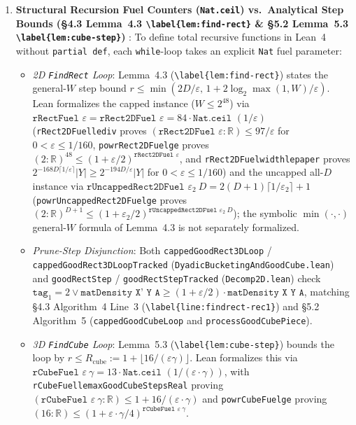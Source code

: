\documentclass[10pt,letterpaper]{article}
\renewcommand{\_}{\origunderscore\allowbreak}
\newcommand{\code}[1]{\texttt{#1}}
\begin{document}
\begin{enumerate}
  \item \textbf{Structural Recursion Fuel Counters (\code{Nat.ceil}) vs.\ Analytical Step Bounds (\S 4.3 Lemma~4.3 \code{\textbackslash label\{lem:find-rect\}} \& \S 5.2 Lemma~5.3 \code{\textbackslash label\{lem:cube-step\}}) }:
  To define total recursive functions in Lean~4 without \code{partial def}, each \code{while}-loop takes an explicit \code{Nat} fuel parameter:
  \begin{itemize}
    \item \emph{2D \code{FindRect} Loop}: Lemma~4.3 (\code{\textbackslash label\{lem:find-rect\}}) states the general-$W$ step bound $r \le \min(2D/\varepsilon,\, 1 + 2\log_2 \max(1, W)/\varepsilon)$. Lean formalizes the capped instance ($W \le 2^{48}$) via $\code{rRectFuel }\varepsilon = \code{rRect2DFuel }\varepsilon = 84 \cdot \code{Nat.ceil }(1 / \varepsilon)$ (\code{rRect2DFuel\_le\_div} proves $(\code{rRect2DFuel }\varepsilon : \mathbb{R}) \le 97 / \varepsilon$ for $0 < \varepsilon \le 1/160$, \code{pow\_rRect2DFuel\_ge} proves $(2 : \mathbb{R})^{48} \le (1 + \varepsilon / 2)^{\code{rRect2DFuel }\varepsilon}$, and \code{rRect2DFuel\_width\_le\_paper} proves $2^{-168 D \lceil 1/\varepsilon \rceil}|Y| \ge 2^{-194 D / \varepsilon}|Y|$ for $0 < \varepsilon \le 1/160$) and the uncapped all-$D$ instance via $\code{rUncappedRect2DFuel }\varepsilon_2\ D = 2(D+1)\lceil 1/\varepsilon_2 \rceil + 1$ (\code{pow\_rUncappedRect2DFuel\_ge} proves $(2 : \mathbb{R})^{D+1} \le (1 + \varepsilon_2 / 2)^{\code{rUncappedRect2DFuel }\varepsilon_2\ D}$); the symbolic $\min(\cdot, \cdot)$ general-$W$ formula of Lemma~4.3 is not separately formalized.
    \item \emph{Prune-Step Disjunction}: Both \code{cappedGoodRect3DLoop} / \code{cappedGoodRect3DLoopTracked} (\code{DyadicBucketingAndGoodCube.lean}) and \code{goodRectStep} / \code{goodRectStepTracked} (\code{Decomp2D.lean}) check $\code{tag}_1 = 2 \vee \code{matDensity X' Y A} \ge (1 + \varepsilon / 2) \cdot \code{matDensity X Y A}$, matching \S 4.3 Algorithm~4 Line~3 (\code{\textbackslash label\{line:findrect-rec1\}}) and \S 5.2 Algorithm~5 (\code{cappedGoodCubeLoop} and \code{processGoodCubePiece}).
    \item \emph{3D \code{FindCube} Loop}: Lemma~5.3 (\code{\textbackslash label\{lem:cube-step\}}) bounds the loop by $r \le R_{\text{cube}} := 1 + \lfloor 16 / (\varepsilon\gamma) \rfloor$. Lean formalizes this via $\code{rCubeFuel }\varepsilon\ \gamma = 13 \cdot \code{Nat.ceil }(1 / (\varepsilon \cdot \gamma))$, with \code{rCubeFuel\_le\_maxGoodCubeStepsReal} proving $(\code{rCubeFuel }\varepsilon\ \gamma : \mathbb{R}) \le 1 + 16 / (\varepsilon \cdot \gamma)$ and \code{pow\_rCubeFuel\_ge} proving $(16 : \mathbb{R}) \le (1 + \varepsilon \cdot \gamma / 4)^{\code{rCubeFuel }\varepsilon\ \gamma}$.

\end{itemize}
\end{enumerate}
\end{document}

